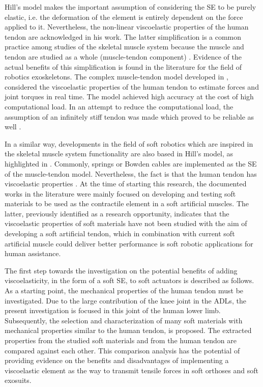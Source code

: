 Hill's model makes the important assumption of considering the SE to be purely elastic, i.e. the deformation of the element is entirely dependent on the force applied to it. Nevertheless, the non-linear viscoelastic properties of the human tendon are acknowledged in his work. The latter simplification is a common practice among studies of the skeletal muscle system because the muscle and tendon are studied as a whole (muscle-tendon component) \cite{zajac1989muscle}. Evidence of the actual benefits of this simplification is found in the literature for the field of robotics exoskeletons. The complex muscle-tendon model developed in \cite{lloyd2003emg}, considered the viscoelastic properties of the human tendon to estimate forces and joint torques in real time. The model achieved high accuracy at the cost of high computational load. In an attempt to reduce the computational load, the assumption of an infinitely stiff tendon was made which proved to be reliable as well \cite{sartori2009stiff}.

In a similar way, developments in the field of soft robotics which are inspired in the skeletal muscle system functionality are also based in Hill's model, as highlighted in . Commonly, springs \cite{park2011bio} or Bowden cables \cite{Zhang2013a} are implemented as the SE of the muscle-tendon model. Nevertheless, the fact is that the human tendon has viscoelastic properties \cite{maurel1998biomechanical}. At the time of starting this research, the documented works in the literature were mainly focused on developing and testing soft materials to be used as the contractile element in a soft artificial muscles. The latter, previously identified as a research opportunity, indicates that the viscoelastic properties of soft materials have not been studied with the aim of developing a soft artificial tendon, which in combination with current soft artificial muscle could deliver better performance is soft robotic applications for human assistance.

The first step towards the investigation on the potential benefits of adding viscoelasticity, in the form of a soft SE, to soft actuators is described as follows. As a starting point, the mechanical properties of the human tendon must be investigated. Due to the large contribution of the knee joint in the ADLs, the present investigation is focused in this joint of the human lower limb. Subsequently, the selection and characterization of many soft materials with mechanical properties similar to the human tendon, is proposed. The extracted properties from the studied soft materials and from the human tendon are compared against each other. This comparison analysis has the potential of providing evidence on the benefits and disadvantages of implementing a viscoelastic element as the way to transmit tensile forces in soft orthoses and soft exosuits.

